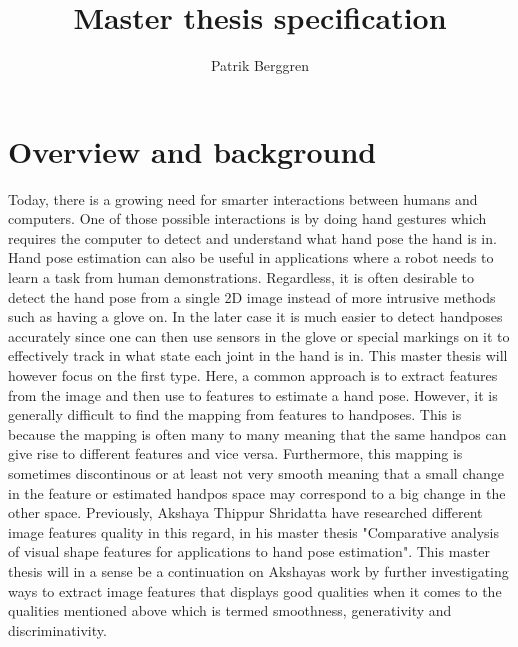 \documentclass[12pt]{article}
\begin{document}
\newcommand{\B}{\cellcolor{blue!25}}
\newcommand{\BB}{\cellcolor{blue!100}}
\newcommand{\R}{\cellcolor{red!25}}
\newcommand{\RR}{\cellcolor{red!100}}

\title{Master thesis specification}
\author{Patrik Berggren}
\maketitle
\section*{Overview and background}
Today, there is a growing need for smarter interactions between humans and computers.
One of those possible interactions is by doing hand gestures which requires the computer to detect and understand what hand pose the hand is in.
Hand pose estimation can also be useful in applications where a robot needs to learn a task from human demonstrations.
Regardless, it is often desirable to detect the hand pose from a single 2D image instead of more intrusive methods such as having a glove on.
In the later case it is much easier to detect handposes accurately since one can then use sensors in the glove or special markings on it to effectively track in what state each joint in the hand is in.
This master thesis will however focus on the first type.
Here, a common approach is to extract features from the image and then use to features to estimate a hand pose.
However, it is generally difficult to find the mapping from features to handposes.
This is because the mapping is often many to many meaning that the same handpos can give rise to different features and vice versa.
Furthermore, this mapping is sometimes discontinous or at least not very smooth meaning that a small change in the feature or estimated handpos space may correspond to a big change in the other space.
Previously, Akshaya Thippur Shridatta have researched different image features quality in this regard, in his master thesis "Comparative analysis of visual shape features for applications to hand pose estimation".
This master thesis will in a sense be a continuation on Akshayas work by further investigating ways to extract image features that displays good qualities when it comes to the qualities mentioned above which is termed smoothness, generativity and discriminativity.
\end{document}
